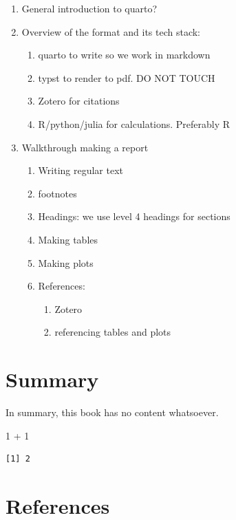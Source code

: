 \documentclass[
  letterpaper,
  DIV=11,
  numbers=noendperiod]{scrreprt}
\newenvironment{Shaded}{\begin{snugshade}}{\end{snugshade}}
\newcommand{\DecValTok}[1]{\textcolor[rgb]{0.68,0.00,0.00}{#1}}
\newcommand{\SpecialCharTok}[1]{\textcolor[rgb]{0.37,0.37,0.37}{#1}}
\providecommand{\tightlist}{%
  \setlength{\itemsep}{0pt}\setlength{\parskip}{0pt}}\usepackage{longtable,booktabs,array}
\newlength{\cslhangindent}
\newenvironment{CSLReferences}[2] %
 {\begin{list}{}{%
  \setlength{\itemindent}{0pt}
  \setlength{\leftmargin}{0pt}
  \setlength{\parsep}{0pt}
  \ifodd #1
   \setlength{\leftmargin}{\cslhangindent}
   \setlength{\itemindent}{-1\cslhangindent}
  \fi
  \setlength{\itemsep}{#2\baselineskip}}}
 {\end{list}}
\begin{document}
\begin{enumerate}
\def\labelenumi{\arabic{enumi}.}
\tightlist
\item
  General introduction to quarto?
\item
  Overview of the format and its tech stack:

  \begin{enumerate}
  \def\labelenumii{\arabic{enumii}.}
  \tightlist
  \item
    quarto to write so we work in markdown
  \item
    typst to render to pdf. DO NOT TOUCH
  \item
    Zotero for citations
  \item
    R/python/julia for calculations. Preferably R
  \end{enumerate}
\item
  Walkthrough making a report

  \begin{enumerate}
  \def\labelenumii{\arabic{enumii}.}
  \tightlist
  \item
    Writing regular text
  \item
    footnotes
  \item
    Headings: we use level 4 headings for sections
  \item
    Making tables
  \item
    Making plots
  \item
    References:

    \begin{enumerate}
    \def\labelenumiii{\arabic{enumiii}.}
    \tightlist
    \item
      Zotero
    \item
      referencing tables and plots
    \end{enumerate}
  \end{enumerate}
\end{enumerate}


\chapter{Summary}\label{summary}

In summary, this book has no content whatsoever.

\begin{Shaded}
\begin{Highlighting}[]
\DecValTok{1} \SpecialCharTok{+} \DecValTok{1}
\end{Highlighting}
\end{Shaded}

\begin{verbatim}
[1] 2
\end{verbatim}


\chapter*{References}\label{references}


\label{refs}
\begin{CSLReferences}{0}{1}
\end{CSLReferences}
\end{document}
